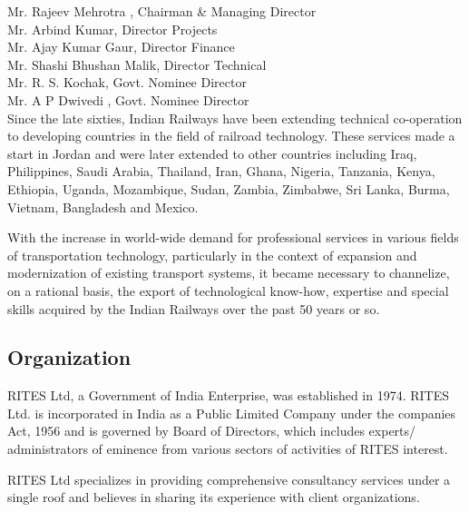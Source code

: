 Mr. Rajeev Mehrotra , Chairman \& Managing Director\\

Mr. Arbind Kumar, Director Projects \\

Mr. Ajay Kumar Gaur, Director Finance \\

Mr. Shashi Bhushan Malik,  Director Technical \\

Mr. R. S. Kochak, Govt. Nominee Director \\

Mr. A P Dwivedi , Govt. Nominee Director   \\



{\color[rgb]{0.0,0.0,0.04}
Since the late sixties, Indian Railways have been extending technical co-operation to developing countries in the field
of railroad technology. These services made a start in Jordan and were later extended to other countries including
Iraq, Philippines, Saudi Arabia, Thailand, Iran, Ghana, Nigeria, Tanzania, Kenya, Ethiopia, Uganda, Mozambique, Sudan,
Zambia, Zimbabwe, Sri Lanka, Burma, Vietnam, Bangladesh and Mexico.}


\bigskip

{\color[rgb]{0.0,0.0,0.039215688}
With the increase in world-wide demand for professional services in various fields of transportation technology,
particularly in the context of expansion and modernization of existing transport systems, it became necessary to
channelize, on a rational basis, the export of technological know-how, expertise and special skills acquired by the
Indian Railways over the past 50 years or so. }


\bigskip

\subsection{Organization}

\bigskip

{\color[rgb]{0.0,0.0,0.039215688}
RITES Ltd, a Government of India Enterprise, was established in 1974. RITES Ltd. is incorporated in India as a Public
Limited Company under the companies Act, 1956 and is governed by Board of Directors, which includes experts/
administrators of eminence from various sectors of activities of RITES interest. }


\bigskip

{\color[rgb]{0.0,0.0,0.039215688}
RITES Ltd specializes in providing comprehensive consultancy services under a single roof and believes in sharing its
experience with client organizations. \ }


